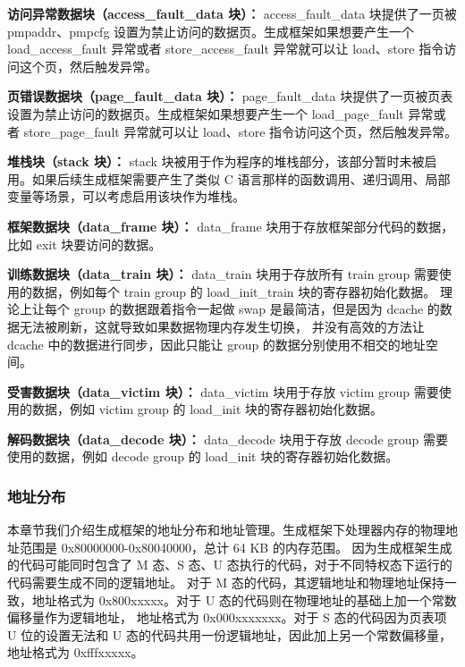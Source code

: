 \textbf{访问异常数据块（access\_fault\_data 块）：}
access\_fault\_data 块提供了一页被 pmpaddr、pmpcfg 设置为禁止访问的数据页。生成框架如果想要产生一个 load\_access\_fault 异常或者
store\_access\_fault 异常就可以让 load、store 指令访问这个页，然后触发异常。\par

\textbf{页错误数据块（page\_fault\_data 块）：}
page\_fault\_data 块提供了一页被页表设置为禁止访问的数据页。生成框架如果想要产生一个 load\_page\_fault 异常或者
store\_page\_fault 异常就可以让 load、store 指令访问这个页，然后触发异常。\par

\textbf{堆栈块（stack 块）：}
stack 块被用于作为程序的堆栈部分，该部分暂时未被启用。如果后续生成框架需要产生了类似 C 语言那样的函数调用、递归调用、局部变量等场景，可以考虑启用该块作为堆栈。\par

\textbf{框架数据块（data\_frame 块）：}
data\_frame 块用于存放框架部分代码的数据，比如 exit 块要访问的数据。\par

\textbf{训练数据块（data\_train 块）：}
data\_train 块用于存放所有 train group 需要使用的数据，例如每个 train group 的 load\_init\_train 块的寄存器初始化数据。
理论上让每个 group 的数据跟着指令一起做 swap 是最简洁，但是因为 dcache 的数据无法被刷新，这就导致如果数据物理内存发生切换，
并没有高效的方法让 dcache 中的数据进行同步，因此只能让 group 的数据分别使用不相交的地址空间。\par

\textbf{受害数据块（data\_victim 块）：}
data\_victim 块用于存放 victim group 需要使用的数据，例如 victim group 的 load\_init 块的寄存器初始化数据。\par

\textbf{解码数据块（data\_decode 块）：}
data\_decode 块用于存放 decode group 需要使用的数据，例如 decode group 的 load\_init 块的寄存器初始化数据。\par

\subsubsection{地址分布}

本章节我们介绍生成框架的地址分布和地址管理。生成框架下处理器内存的物理地址范围是 0x80000000-0x80040000，总计 64 KB 的内存范围。
因为生成框架生成的代码可能同时包含了 M 态、S 态、U 态执行的代码，对于不同特权态下运行的代码需要生成不同的逻辑地址。
对于 M 态的代码，其逻辑地址和物理地址保持一致，地址格式为 0x800xxxxx。对于 U 态的代码则在物理地址的基础上加一个常数偏移量作为逻辑地址，
地址格式为 0x000xxxxxxx。对于 S 态的代码因为页表项 U 位的设置无法和 U 态的代码共用一份逻辑地址，因此加上另一个常数偏移量，地址格式为
0xfffxxxxx。\par

